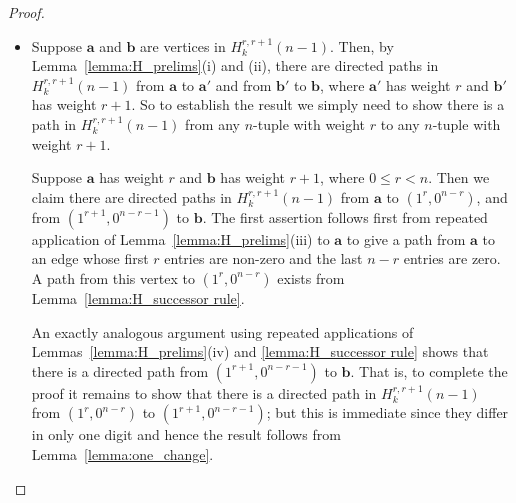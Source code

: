 \documentclass[a4paper,11pt]{article}
\theoremstyle{plain}
\theoremstyle{definition}
\theoremstyle{remark}
\begin{document}
\begin{proof}
\begin{itemize}
Finally suppose $1<r<n-1$, and thus $n\geq4$ --- we need to show that $H_k^{r,r}(n-1)$ is not
strongly connected.  Regardless of $r$ there will exist two edges in $H_k^{r,r}(n-1)$
corresponding to the $n$-tuples $\mathbf{a}=(1^r,0^{n-r})$ and
$\mathbf{b}=(1,0,1^{r-1},0^{n-r-1})$, and all the constituent strings are non-empty since
$n\geq 4$ and $1<r<n-1$.  We claim that there is no path in $H_k^{r,r}(n-1)$ linking
$\mathbf{a}$ to $\mathbf{b}$.

This holds because, from Lemma~\ref{lemma:H_successor rule}, any edge on a path in
$H_k^{r,r}(n-1)$ starting from $\mathbf{a}$ must contain $r$ consecutive non-zero entries
(working cyclically). Similarly, any edges on a path starting from $\mathbf{b}$ must contain a
zero followed by $r-1$ consecutive non-zero entries and then another zero (again working
cyclically). That is $\mathbf{b}$ cannot be on a path starting at $\mathbf{a}$, and vice versa.

\item[(ii)] Suppose $\mathbf{a}$ and $\mathbf{b}$ are vertices in $H_k^{r,r+1}(n-1)$.  Then, by
    Lemma~\ref{lemma:H_prelims}(i) and (ii), there are directed paths in $H_k^{r,r+1}(n-1)$
    from $\mathbf{a}$ to $\mathbf{a}'$ and from $\mathbf{b}'$ to $\mathbf{b}$, where
    $\mathbf{a}'$ has weight $r$ and $\mathbf{b}'$ has weight $r+1$.  So to establish the
    result we simply need to show there is a path in $H_k^{r,r+1}(n-1)$ from any $n$-tuple with
    weight $r$ to any $n$-tuple with weight $r+1$.

Suppose $\mathbf{a}$ has weight $r$ and $\mathbf{b}$ has weight $r+1$, where $0\leq r<n$. Then
we claim there are directed paths in $H_k^{r,r+1}(n-1)$ from $\mathbf{a}$ to $(1^r,0^{n-r})$,
and from $(1^{r+1},0^{n-r-1})$ to $\mathbf{b}$. The first assertion follows first from repeated
application of Lemma~\ref{lemma:H_prelims}(iii) to $\mathbf{a}$ to give a path from
$\mathbf{a}$ to an edge whose first $r$ entries are non-zero and the last $n-r$ entries are
zero.  A path from this vertex to $(1^r,0^{n-r})$ exists from Lemma~\ref{lemma:H_successor
rule}.

An exactly analogous argument using repeated applications of
Lemmas~\ref{lemma:H_prelims}(iv) and \ref{lemma:H_successor rule} shows that there is a
directed path from $(1^{r+1},0^{n-r-1})$ to $\mathbf{b}$.  That is, to complete the proof
it remains to show that there is a directed path in $H_k^{r,r+1}(n-1)$ from
$(1^{r},0^{n-r})$ to $(1^{r+1},0^{n-r-1})$; but this is immediate since they differ in only
one digit and hence the result follows from Lemma~\ref{lemma:one_change}.

\end{itemize}
\end{proof}
\end{document}
